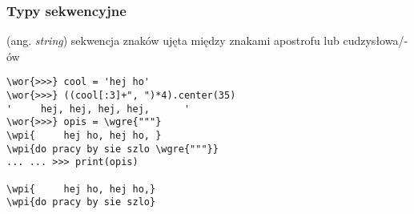 \begin{frame}[fragile]
\frametitle{Typy sekwencyjne}
\begin{description}\small
 \item[\wor{ciąg tekstowy}] (ang. \emph{string}) sekwencja znaków
 ujęta między znakami apostrofu lub cudzysłowa/-ów
\end{description}

\begin{Verbatim}[fontsize=\scriptsize,codes={\catcode`$=3\catcode`^=7},
                 frame=single,framesep=3mm,commandchars=\\\{\}]
\wor{>>>} cool = 'hej ho'
\wor{>>>} ((cool[:3]+", ")*4).center(35)
'     hej, hej, hej, hej,      '
\wor{>>>} opis = \wgre{"""}
\wpi{     hej ho, hej ho, }
\wpi{do pracy by sie szlo \wgre{"""}}
... ... >>> print(opis)

\wpi{     hej ho, hej ho,}
\wpi{do pracy by sie szlo}
\end{Verbatim}
\end{frame}


